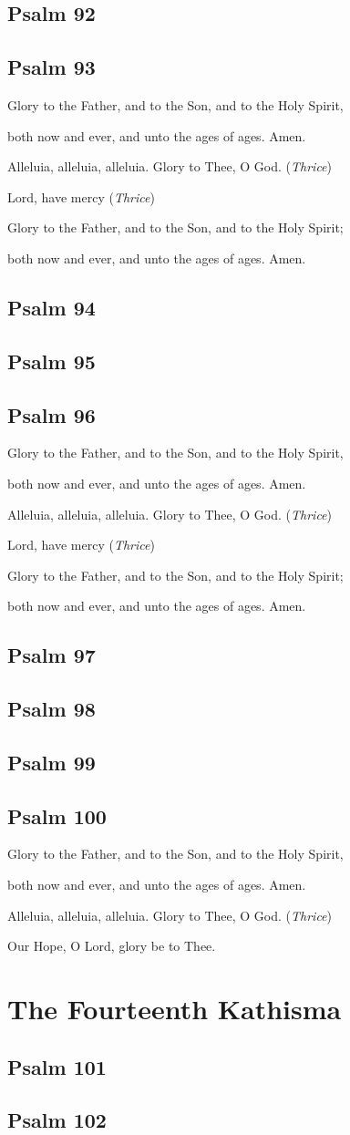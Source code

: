 \documentclass[12pt,openany]{book}
\newcommand{\kathismabreak}{
  \medskip
  \begin{center}
  \begin{footnotesize}
  Glory to the Father, and to the Son, and to the Holy Spirit,
  
  both now and ever, and unto the ages of ages. Amen.

  Alleluia, alleluia, alleluia. Glory to Thee, O God. (\textit{Thrice})

  Lord, have mercy (\textit{Thrice})

  Glory to the Father, and to the Son, and to the Holy Spirit;
  
  both now and ever, and unto the ages of ages. Amen.
  \end{footnotesize}
  \end{center}
  \smallbreak
}
\newcommand{\kathismaend}{
  \medskip
  \begin{center}
  \begin{footnotesize}
  Glory to the Father, and to the Son, and to the Holy Spirit,
  
  both now and ever, and unto the ages of ages. Amen.

  Alleluia, alleluia, alleluia. Glory to Thee, O God. (\textit{Thrice})

  Our Hope, O Lord, glory be to Thee.
  \end{footnotesize}
  \end{center}
  \smallbreak
}
\begin{document}
\section{Psalm 92}

\smallskip
\section{Psalm 93}


\kathismabreak
\smallskip
\section{Psalm 94}

\smallskip
\section{Psalm 95}

\smallskip
\section{Psalm 96}


\kathismabreak
\smallskip
\section{Psalm 97}

\smallskip
\section{Psalm 98}

\smallskip
\section{Psalm 99}

\smallskip
\section{Psalm 100}


\kathismaend

\chapter*{The Fourteenth Kathisma}
\smallskip
\section{Psalm 101}

\smallskip
\section{Psalm 102}

\end{document}
